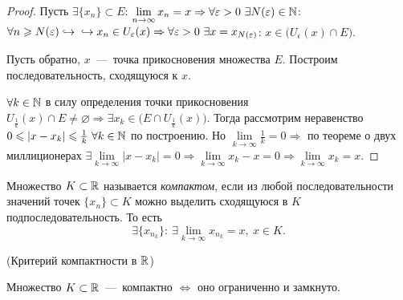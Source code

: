 \begin{proof}
    Пусть $\exists \{ x_{n} \} \subset E$: $\lim\limits_{n\to \infty} x_{n} = x \Rightarrow \forall \varepsilon > 0 \  \exists N (\varepsilon) \in \mathbb{N}$: $\forall n \geq N (\epsilon) \hookrightarrow \newline \hookrightarrow x_{n} \in U_{\epsilon} (x) \Rightarrow \forall \epsilon > 0 \  \exists x = x_{N (\epsilon)}$: $x \in \big(U_{\epsilon} (x) \cap E\big).$

    Пусть обратно, $x$~---~точка прикосновения множества $E$. Построим последовательность, сходящуюся к $x$.

    $\forall k \in \mathbb{N}$ в силу определения точки прикосновения $U_{\frac{1}{k}} (x) \cap E \neq \varnothing \Rightarrow \exists x_{k} \in \big(E \cap U_{\frac{1}{k}} (x)\big).$ Тогда рассмотрим неравенство $0 \leqslant |x - x_{k}| \leqslant \frac{1}{k} \  \forall k \in \mathbb{N}$ по построению. Но $\lim\limits_{k\to \infty} \frac{1}{k} = 0 \Rightarrow$ по теореме о двух миллиционерах $\exists \lim\limits_{k\to \infty} |x - x_{k}| = 0 \Rightarrow \lim\limits_{k\to \infty} x_{k} - x = 0 \Rightarrow \lim\limits_{k\to \infty} x_{k} = x$.
\end{proof}
\begin{definition}
    Множество $K \subset \mathbb{R}$ называется \textit{компактом}, если из любой последовательности значений точек $\{ x_{n} \} \subset K$ можно выделить сходящуюся в $K$ подпоследовательность. То есть
    $$ \exists \{ x_{n_{k}} \}: \ \exists \lim\limits_{k\to \infty} x_{n_{k}} = x,\  x \in K.$$
\end{definition}
\begin{theorem}
    \hypertarget{thm3.2}{(Критерий компактности в $\mathbb{R}$)} Множество $K \subset \mathbb{R}$~---~компактно $\Leftrightarrow$ оно ограниченно и замкнуто. 
\end{theorem}
